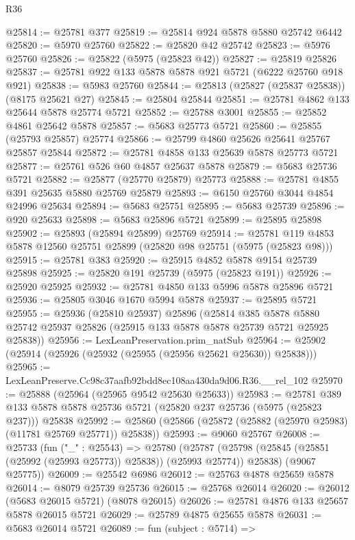 \begin{lexlean}{R36}
\begin{coremodule}
@25814 := @25781 @377
@25819 := @25814 @924 @5878 @5880 @25742 @6442
@25820 := @5970 @25760
@25822 := @25820 @42 @25742
@25823 := @5976 @25760
@25826 := @25822 (@5975 (@25823 @42))
@25827 := @25819 @25826
@25837 := @25781 @922 @133 @5878 @5878 @921 @5721 (@6222 @25760 @918 @921)
@25838 := @5983 @25760
@25844 := @25813 (@25827 (@25837 @25838)) (@8175 @25621 @27)
@25845 := @25804 @25844
@25851 := @25781 @4862 @133 @25644 @5878 @25774 @5721
@25852 := @25788 @3001
@25855 := @25852 @4861 @25642 @5878
@25857 := @5683 @25773 @5721
@25860 := @25855 (@25793 @25857) @25774
@25866 := @25799 @4860 @25626 @25641 @25767 @25857 @25844
@25872 := @25781 @4858 @133 @25639 @5878 @25773 @5721
@25877 := @25761 @526 @60 @4857 @25637 @5878
@25879 := @5683 @25736 @5721
@25882 := @25877 (@25770 @25879) @25773
@25888 := @25781 @4855 @391 @25635 @5880 @25769 @25879
@25893 := @6150 @25760 @3044 @4854 @24996 @25634
@25894 := @5683 @25751
@25895 := @5683 @25739
@25896 := @920 @25633
@25898 := @5683 @25896 @5721
@25899 := @25895 @25898
@25902 := @25893 (@25894 @25899) @25769
@25914 := @25781 @119 @4853 @5878 @12560 @25751 @25899 (@25820 @98 @25751 (@5975 (@25823 @98)))
@25915 := @25781 @383
@25920 := @25915 @4852 @5878 @9154 @25739 @25898
@25925 := @25820 @191 @25739 (@5975 (@25823 @191))
@25926 := @25920 @25925
@25932 := @25781 @4850 @133 @5996 @5878 @25896 @5721
@25936 := @25805 @3046 @1670 @5994 @5878
@25937 := @25895 @5721
@25955 := @25936
    (@25810 @25937)
    @25896
    (@25814
      @385
      @5878
      @5880
      @25742
      @25937
      @25826
      (@25915 @133 @5878 @5878 @25739 @5721 @25925 @25838))
@25956 := LexLeanPreservation.prim_natSub
@25964 := @25902 (@25914 (@25926 (@25932 (@25955 (@25956 @25621 @25630)) @25838)))
@25965 := LexLeanPreserve.Cc98c37aafb92bdd8ec108aa430da9d06.R36.__rel_102
@25970 := @25888 (@25964 (@25965 @9542 @25630 @25633))
@25983 := @25781
    @389
    @133
    @5878
    @5878
    @25736
    @5721
    (@25820 @237 @25736 (@5975 (@25823 @237)))
    @25838
@25992 := @25860 (@25866 (@25872 (@25882 (@25970 @25983) (@11781 @25769 @25771)) @25838))
@25993 := @9060 @25767
@26008 := @25733
    (fun ("_" : @25543) =>
    @25780
      (@25787 (@25798 (@25845 (@25851 (@25992 (@25993 @25773)) @25838)) (@25993 @25774)) @25838)
      (@9067 @25775))
@26009 := @25542 @6986
@26012 := @25763 @4878 @25659 @5878
@26014 := @8079 @25739 @25736
@26015 := @25768 @26014
@26020 := @26012 (@5683 @26015 @5721) (@8078 @26015)
@26026 := @25781 @4876 @133 @25657 @5878 @26015 @5721
@26029 := @25789 @4875 @25655 @5878
@26031 := @5683 @26014 @5721
@26089 := fun (subject : @5714) =>

\end{coremodule}
\end{lexlean}
